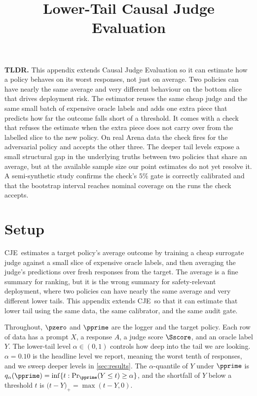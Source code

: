 \documentclass[11pt]{article}
\title{Lower-Tail Causal Judge Evaluation}
\author{}
\date{}
\newcommand{\CJE}{\textsc{CJE}}
\newcommand{\stoploss}[2]{\bigl(#1 - #2\bigr)_{+}}
\begin{document}
\maketitle

\noindent\textbf{TLDR.} This appendix extends Causal Judge Evaluation so it can estimate how a policy behaves on its worst responses, not just on average. Two policies can have nearly the same average and very different behaviour on the bottom slice that drives deployment risk. The estimator reuses the same cheap judge and the same small batch of expensive oracle labels and adds one extra piece that predicts how far the outcome falls short of a threshold. It comes with a check that refuses the estimate when the extra piece does not carry over from the labelled slice to the new policy. On real Arena data the check fires for the adversarial policy and accepts the other three. The deeper tail levels expose a small structural gap in the underlying truths between two policies that share an average, but at the available sample size our point estimates do not yet resolve it. A semi-synthetic study confirms the check's $5\%$ gate is correctly calibrated and that the bootstrap interval reaches nominal coverage on the runs the check accepts.

\section{Setup}

\CJE\ estimates a target policy's average outcome by training a cheap surrogate judge against a small slice of expensive oracle labels, and then averaging the judge's predictions over fresh responses from the target. The average is a fine summary for ranking, but it is the wrong summary for safety-relevant deployment, where two policies can have nearly the same average and very different lower tails. This appendix extends \CJE\ so that it can estimate that lower tail using the same data, the same calibrator, and the same audit gate.


Throughout, $\pzero$ and $\pprime$ are the logger and the target policy. Each row of data has a prompt $X$, a response $A$, a judge score $\Sscore$, and an oracle label $Y$. The lower-tail level $\alpha \in (0,1)$ controls how deep into the tail we are looking. $\alpha = 0.10$ is the headline level we report, meaning the worst tenth of responses, and we sweep deeper levels in \cref{sec:results}. The $\alpha$-quantile of $Y$ under $\pprime$ is $q_\alpha(\pprime) = \inf\{t : \Pr_{\pprime}(Y \le t) \ge \alpha\}$, and the shortfall of $Y$ below a threshold $t$ is $\stoploss{t}{Y} = \max(t - Y, 0)$.
\end{document}
